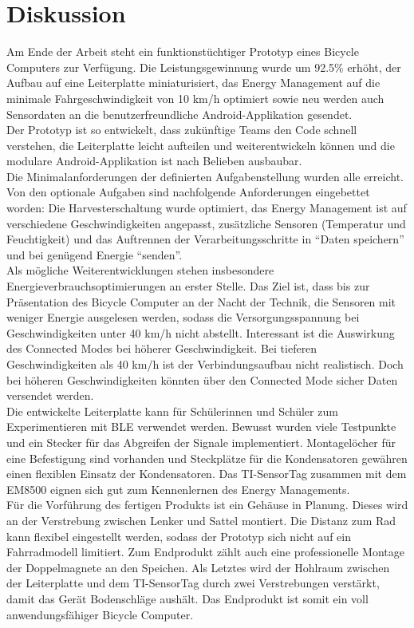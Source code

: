 \chapter{Diskussion}

Am Ende der Arbeit steht ein funktionstüchtiger Prototyp eines Bicycle Computers zur Verfügung. Die Leistungsgewinnung wurde um 92.5\thinspace\% erhöht, der Aufbau auf eine Leiterplatte miniaturisiert, das Energy Management auf die minimale Fahrgeschwindigkeit von 10 km/h optimiert sowie neu werden auch Sensordaten an die benutzerfreundliche Android-Applikation gesendet.\\

Der Prototyp ist so entwickelt, dass zukünftige Teams den Code schnell verstehen, die Leiterplatte leicht aufteilen und weiterentwickeln können und die modulare Android-Applikation ist nach Belieben ausbaubar.\\

Die Minimalanforderungen der definierten Aufgabenstellung wurden alle erreicht. Von den optionale Aufgaben sind nachfolgende Anforderungen eingebettet worden: Die Harvesterschaltung wurde optimiert, das Energy Management ist auf verschiedene Geschwindigkeiten angepasst, zusätzliche Sensoren (Temperatur und Feuchtigkeit) und das Auftrennen der Verarbeitungsschritte in ``Daten speichern'' und bei genügend Energie ``senden''.\\

Als mögliche Weiterentwicklungen stehen insbesondere Energieverbrauchsoptimierungen an erster Stelle. Das Ziel ist, dass bis zur Präsentation des Bicycle Computer an der Nacht der Technik, die Sensoren mit weniger Energie ausgelesen werden, sodass die Versorgungsspannung bei Geschwindigkeiten unter 40 km/h nicht abstellt. Interessant ist die Auswirkung des Connected Modes bei höherer Geschwindigkeit. Bei tieferen Geschwindigkeiten als 40 km/h ist der Verbindungsaufbau nicht realistisch. Doch bei höheren Geschwindigkeiten könnten über den Connected Mode sicher Daten versendet werden.\\

Die entwickelte Leiterplatte kann für Schülerinnen und Schüler zum Experimentieren mit BLE verwendet werden. Bewusst wurden viele Testpunkte und ein Stecker für das Abgreifen der Signale implementiert. Montagelöcher für eine Befestigung sind vorhanden und Steckplätze für die Kondensatoren gewähren einen flexiblen Einsatz der Kondensatoren. Das TI-SensorTag zusammen mit dem EM8500 eignen sich gut zum Kennenlernen des Energy Managements.\\
\newpage
Für die Vorführung des fertigen Produkts ist ein Gehäuse in Planung. Dieses wird an der Verstrebung zwischen Lenker und Sattel montiert. Die Distanz zum Rad kann flexibel eingestellt werden, sodass der Prototyp sich nicht auf ein Fahrradmodell limitiert. Zum Endprodukt zählt auch eine professionelle Montage der Doppelmagnete an den Speichen. Als Letztes wird der Hohlraum zwischen der Leiterplatte und dem TI-SensorTag durch zwei Verstrebungen verstärkt, damit das Gerät Bodenschläge aushält. Das Endprodukt ist somit ein voll anwendungsfähiger Bicycle Computer.\\

